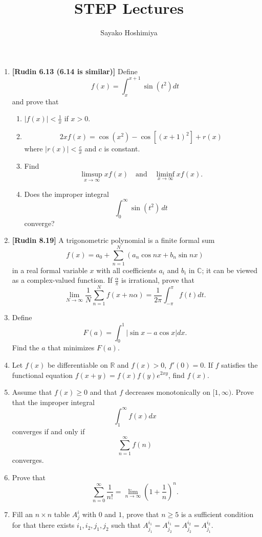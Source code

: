 \documentclass[10pt]{article}
\title{STEP Lectures}
\author{Sayako Hoshimiya}
\begin{document}
\begin{CJK*}{UTF8}{gbsn}
\maketitle
\renewcommand{\setminus}{\mathbin{\backslash}}
\def \setminus {\mathbin{\backslash}}

\begin{enumerate}
\item \textbf{[Rudin 6.13 (6.14 is similar)]} Define $$f(x)=\int_{x}^{x+1} \sin \left(t^{2}\right) d t$$ and prove that
\begin{enumerate}[label=\alph*]
\item $|f(x)|<\frac{1}{x}$ if $x>0$.
\item $$2 x f(x)=\cos \left(x^{2}\right)-\cos \left[(x+1)^{2}\right]+r(x)$$ where $|r(x)|<\frac{c}{x}$ and $c$ is constant.
\item Find $$\limsup_{x\to\infty}xf(x)\quad\text{and}\quad\liminf_{x\to\infty}xf(x).$$
\item Does the improper integral $$\int_0^\infty\sin(t^2)\,dt$$ converge?
\end{enumerate}
\item \textbf{[Rudin 8.19]} A trigonometric polynomial is a finite formal sum $$f(x)=a_{0}+\sum_{n=1}^{N}\left(a_{n} \cos n x+b_{n} \sin n x\right)$$ in a real formal variable $x$ with all coefficients $a_i$ and $b_i$ in $\mathbb{C}$; it can be viewed as a complex-valued function. If $\frac{\alpha}{\pi}$ is irrational, prove that $$\lim _{N \rightarrow \infty} \frac{1}{N} \sum_{n=1}^{N} f(x+n \alpha)=\frac{1}{2 \pi} \int_{-\pi}^{\pi} f(t) d t.$$
\item Define $$F(a)=\int_{0}^{1}|\sin x-a \cos x| d x.$$ Find the $a$ that minimizes $F(a)$.
\item Let $f(x)$ be differentiable on $\mathbb{R}$ and $f(x)>0$, $f'(0)=0$. If $f$ satisfies the functional equation $f(x+y)=f(x)f(y)e^{2xy}$, find $f(x)$.
\item Assume that $f(x)\geq 0$ and that $f$ decreases monotonically on $[1,\infty)$. Prove that the improper integral $$\int_{1}^{\infty} f(x) d x$$ converges if and only if $$\sum_{n=1}^{\infty} f(n)$$ converges.
\item Prove that $$\sum_{n=0}^{\infty} \frac{1}{n !}=\lim _{n \rightarrow \infty}\left(1+\frac{1}{n}\right)^{n}.$$
\item Fill an $n\times n$ table $A^i_j$ with $0$ and $1$, prove that $n\geq 5$ is a sufficient condition for that there exists $i_1,i_2,j_1,j_2$ such that $A^{i_1}_{j_1}=A^{i_1}_{j_2}=A^{i_2}_{j_2}=A^{i_2}_{j_1}$.

\end{enumerate}
\end{CJK*}
\end{document}
